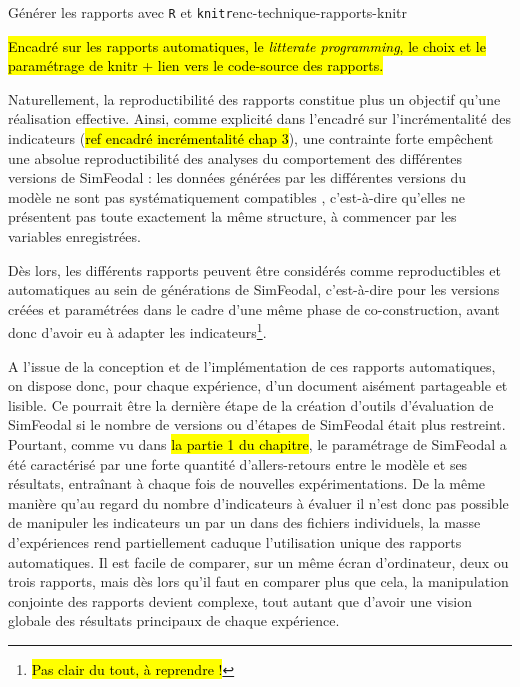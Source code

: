 	
	\begin{encadre}{Générer les rapports avec \texttt{R} et \texttt{knitr}}{enc-technique-rapports-knitr}
		
		\hl{Encadré sur les rapports automatiques, le \textit{\og litterate programming}\fg, le choix et le paramétrage de knitr + lien vers le code-source des rapports.}
		
	\end{encadre}

	
	Naturellement, la reproductibilité des rapports constitue plus un objectif qu'une réalisation effective.
	Ainsi, comme explicité dans l'encadré sur l'incrémentalité des indicateurs (\hl{ref encadré incrémentalité chap 3}), une contrainte forte empêchent une absolue reproductibilité des analyses du comportement des différentes versions de SimFeodal : les données générées par les différentes versions du modèle ne sont pas systématiquement \og compatibles \fg{}, c'est-à-dire qu'elles ne présentent pas toute exactement la même structure, à commencer par les variables enregistrées.

	Dès lors, les différents rapports peuvent être considérés comme reproductibles et automatiques au sein de \og générations \fg{} de SimFeodal, c'est-à-dire pour les versions créées et paramétrées dans le cadre d'une même phase de co-construction, avant donc d'avoir eu à adapter les indicateurs\footnote{
	\hl{Pas clair du tout, à reprendre !}
	}.

	A l'issue de la conception et de l'implémentation de ces rapports automatiques, on dispose donc, pour chaque expérience, d'un document aisément partageable et lisible.
	Ce pourrait être la dernière étape de la création d'outils d'évaluation de SimFeodal si le nombre de versions ou d'étapes de SimFeodal était plus restreint.
	Pourtant, comme vu dans \hl{la partie 1 du chapitre}, le paramétrage de SimFeodal a été caractérisé par une forte quantité d'allers-retours entre le modèle et ses résultats, entraînant à chaque fois de nouvelles expérimentations.
	De la même manière qu'au regard du nombre d'indicateurs à évaluer il n'est donc pas possible de manipuler les indicateurs un par un dans des fichiers individuels, la masse d'expériences rend partiellement caduque l'utilisation unique des rapports automatiques.
	Il est facile de comparer, sur un même écran d'ordinateur, deux ou trois rapports, mais dès lors qu'il faut en comparer plus que cela, la manipulation conjointe des rapports devient complexe, tout autant que d'avoir une vision globale des résultats principaux de chaque expérience.

